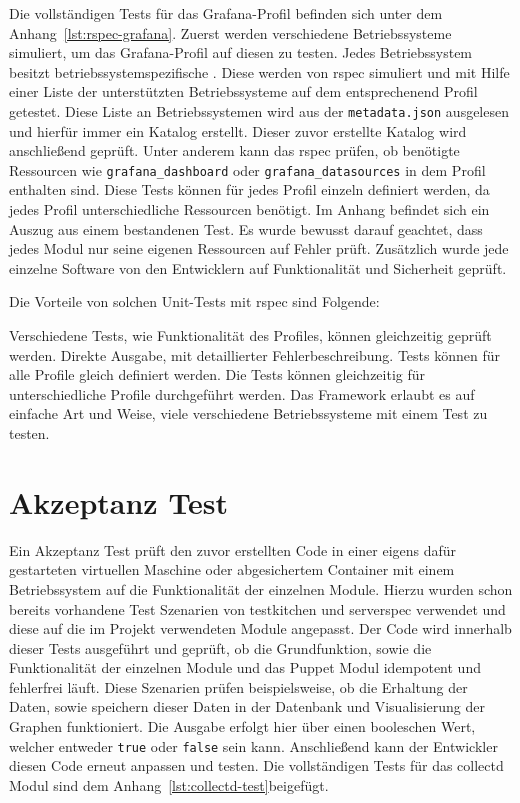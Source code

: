 {Die vollständigen Tests für das Grafana\hyp{}Profil befinden sich unter
dem Anhang~\ref{lst:rspec-grafana}. Zuerst werden verschiedene Betriebssysteme
simuliert, um das Grafana\hyp{}Profil auf diesen zu testen. Jedes
Betriebssystem besitzt betriebssystemspezifische . Diese
werden von rspec simuliert und mit Hilfe einer Liste der unterstützten
Betriebssysteme auf dem entsprechenend Profil getestet. Diese Liste an
Betriebssystemen wird aus der \texttt{metadata.json} ausgelesen und hierfür
immer ein Katalog erstellt.  Dieser zuvor erstellte Katalog wird anschließend
geprüft. Unter anderem kann das rspec prüfen, ob benötigte Ressourcen wie
\texttt{grafana\_dashboard} oder \texttt{grafana\_datasources} in dem Profil
enthalten sind. Diese Tests können für jedes Profil einzeln definiert werden,
da jedes Profil unterschiedliche Ressourcen benötigt. Im Anhang befindet sich
ein Auszug aus einem bestandenen Test. Es wurde bewusst darauf geachtet, dass
jedes Modul nur seine eigenen Ressourcen auf Fehler prüft. Zusätzlich wurde
jede einzelne Software von den Entwicklern auf Funktionalität und Sicherheit
geprüft.

Die Vorteile von solchen Unit\hyp{}Tests mit rspec sind Folgende:

\begin{outline}
  \1 Verschiedene Tests, wie Funktionalität des Profiles, können gleichzeitig
  geprüft werden.
  \1 Direkte Ausgabe, mit detaillierter Fehlerbeschreibung.
  \1 Tests können für alle Profile gleich definiert werden.
  \1 Die Tests können gleichzeitig für unterschiedliche Profile durchgeführt
  werden.
  \1 Das Framework erlaubt es auf einfache Art und Weise, viele verschiedene
  Betriebssysteme mit einem Test zu testen.
\end{outline}
\mr%

\section{Akzeptanz Test}
Ein Akzeptanz Test prüft den zuvor erstellten Code in einer eigens dafür
gestarteten virtuellen Maschine oder abgesichertem Container mit einem
Betriebssystem auf die Funktionalität der einzelnen Module. Hierzu wurden schon
bereits vorhandene Test Szenarien von \gls{testkitchen} und \gls{serverspec}
verwendet und diese auf die im Projekt verwendeten Module angepasst. Der Code
wird innerhalb dieser Tests ausgeführt und geprüft, ob die Grundfunktion, sowie
die Funktionalität der einzelnen Module und das Puppet Modul idempotent und
fehlerfrei läuft. Diese Szenarien prüfen beispielsweise, ob die Erhaltung der
Daten, sowie speichern dieser Daten in der Datenbank und Visualisierung der
Graphen funktioniert. Die Ausgabe erfolgt hier über einen booleschen Wert,
welcher entweder \texttt{true} oder \texttt{false} sein kann. Anschließend
kann der Entwickler diesen Code erneut anpassen und testen. Die vollständigen
Tests für das collectd Modul sind dem Anhang~\ref{lst:collectd-test}beigefügt.

}
